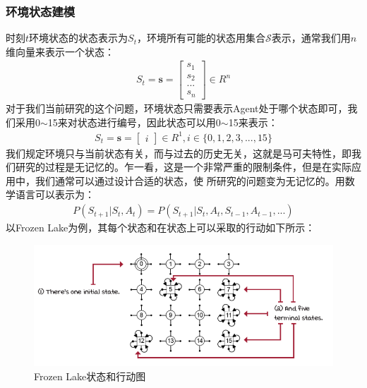 \subsubsection{环境状态建模}
时刻$t$环境状态的状态表示为$S_{t}$，环境所有可能的状态用集合$\mathcal{S}$表示，通常我们用$n$维向量来表示一个状态：
\begin{equation}
\begin{aligned}
S_{t}=\boldsymbol{s} = \begin{bmatrix}
    s_{1} \\
    s_{2} \\
    ... \\
    s_{n}
\end{bmatrix} \in R^{n}
\end{aligned}
\label{state-vector-representation}
\end{equation}
对于我们当前研究的这个问题，环境状态只需要表示Agent处于哪个状态即可，我们采用0$\sim$15来对状态进行编号，因此状态可以用0$\sim$15来表示：
\begin{equation}
\begin{aligned}
S_{t}=\boldsymbol{s} = \begin{bmatrix}
    i
\end{bmatrix} \in R^{1}, i \in \{0, 1, 2, 3, ..., 15\}
\end{aligned}
\label{frozen-lake-state-demo}
\end{equation}
我们规定环境只与当前状态有关，而与过去的历史无关，这就是马可夫特性，即我们研究的过程是无记忆的。乍一看，这是一个非常严重的限制条件，但是在实际应用中，我们通常可以通过设计合适的状态，使
所研究的问题变为无记忆的。用数学语言可以表示为：
\begin{equation}
\begin{aligned}
P(S_{t+1} | S_{t}, A_{t}) = P(S_{t+1} | S_{t}, A_{t}, S_{t-1}, A_{t-1}, ...)
\end{aligned}
\label{markov-property-def}
\end{equation}
以Frozen Lake为例，其每个状态和在状态上可以采取的行动如下所示：
\begin{figure}[H]
	\caption{Frozen Lake状态和行动图}
	\label{p000007}
	\centering
	\includegraphics[width=15cm]{images/p000007}
\end{figure}
